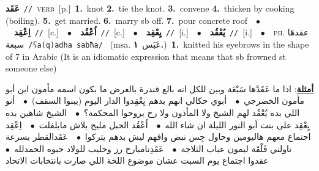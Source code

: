 \documentclass[10pt,a4paper,twoside]{article} %
\begin{document}
\begin{multicols}{2}
{\setlength\topsep{0pt}\textbf{\foreignlanguage{arabic}{عَقَد}}\ {\color{gray}\texttt{//}\color{black}}\ \textsc{verb}\ [p.]\ \textbf{1.}~knot  \textbf{2.}~tie the knot.  \textbf{3.}~convene  \textbf{4.}~thicken by cooking (boiling).  \textbf{5.}~get married.  \textbf{6.}~marry sb off.  \textbf{7.}~pour concrete roof\ \ $\bullet$\ \ \setlength\topsep{0pt}\textbf{\foreignlanguage{arabic}{اِعْقِد}}\ {\color{gray}\texttt{//}\color{black}}\ [c.]\ \ $\bullet$\ \ \setlength\topsep{0pt}\textbf{\foreignlanguage{arabic}{اُعْقُد}}\ {\color{gray}\texttt{//}\color{black}}\ [c.]\ \ $\bullet$\ \ \setlength\topsep{0pt}\textbf{\foreignlanguage{arabic}{يِعْقِد}}\ {\color{gray}\texttt{//}\color{black}}\ [i.]\ \ $\bullet$\ \ \setlength\topsep{0pt}\textbf{\foreignlanguage{arabic}{يُعْقُد}}\ {\color{gray}\texttt{//}\color{black}}\ [i.]\ \ $\bullet$\ \ \textsc{ph.} \color{gray} \foreignlanguage{arabic}{عقدهَا سبعة}\color{black}\ {\color{gray}\texttt{/{\sffamily ʕa(q)adha sabħa}/}\color{black}}\ \color{gray} (msa. \foreignlanguage{arabic}{عَبَس}~\foreignlanguage{arabic}{\textbf{١.}})\color{black}\ \textbf{1.}~knitted his eyebrows in the shape of 7 in Arabic (It is an idiomatic expression that means that sb frowned st someone else)\  \begin{flushright}\color{gray}\foreignlanguage{arabic}{\textbf{\underline{\foreignlanguage{arabic}{أمثلة}}}: اذا ما عَقَدْها سَبْعَة وبين للكل انه بالع قندرة بالعرض ما بكون اسمه مأمون ابن أبو مأمون الخضرجي\ $\bullet$\ \  أبوي حكالي انهم بدهم يِعْقِدوا الدار اليوم (يبنوا السقف)\ $\bullet$\ \  أنو اللي بده يُعْقُد لهم الشيخ ولا المأذون ولا رح يروحوا المحكمة؟\ $\bullet$\ \  الشيخ شاهين بده يِعْقِد على بنت أبو النور الليلة ان شاء الله\ $\bullet$\ \  اُعْقُد الحبل مليح بلاش مايلفلت\ $\bullet$\ \  اِعْقِد اجتماع معهم هاليومين وحاول جِس نبض وافهم ليش بدهم يتركوا\ $\bullet$\ \  عَقَدالقطر بسرعة ناولني فَلْقَة ليمون عباب الثلاجة\ $\bullet$\ \  عَقَدِتامبارح رز وحليب للولاد حبوه الحمدلله\ $\bullet$\ \  عقدوا اجتماع يوم السبت عشان موضوع اللخة اللي صارت بانتخابات الاتحاد}\end{flushright}\color{black}} \vspace{2mm}


\end{multicols}
\end{document}
